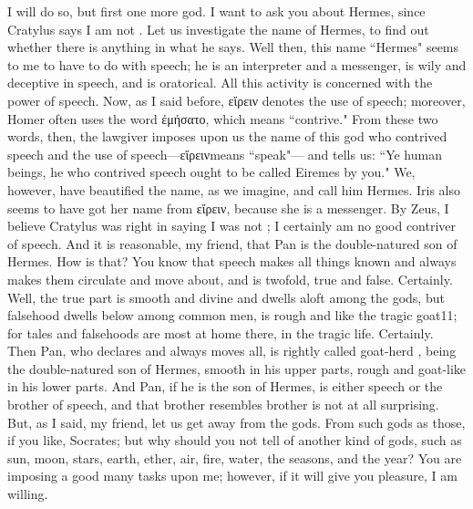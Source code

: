 {{{\hermogenesspeaks
I will do so, but first one more god. I want to ask you about Hermes, since Cratylus says I am not \hermogenesspeaks {}. Let us investigate the name of Hermes, to find out whether there is anything in what he says.
\socratesspeaks
Well then, this name ``Hermes" seems to me to have to do with speech; he is an interpreter  and a messenger,  is wily and deceptive in speech, and is oratorical. All this activity is concerned with the power of speech. Now, as I said before, εἴρειν denotes the use of speech; moreover, Homer often uses the word ἐμήσατο, which means ``contrive." From these two words, then, the lawgiver imposes upon us the name of this god who contrived speech and the use of speech—εἴρεινmeans ``speak"—  and tells us: ``Ye human beings, he who contrived speech  ought to be called Eiremes by you." We, however, have beautified the name, as we imagine, and call him Hermes. Iris also seems to have got her name from εἴρειν, because she is a messenger.
\hermogenesspeaks
By Zeus, I believe Cratylus was right in saying I was not \hermogenesspeaks; I certainly am no good contriver of speech.
\socratesspeaks
And it is reasonable, my friend, that Pan is the double-natured son of Hermes. 
\hermogenesspeaks
How is that?
\socratesspeaks
You know that speech makes all things  known and always makes them circulate and move about, and is twofold, true and false.
\hermogenesspeaks
Certainly.
\socratesspeaks
Well, the true part is smooth and divine and dwells aloft among the gods, but falsehood dwells below among common men, is rough and like the tragic goat11; for tales and falsehoods are most at home there, in the tragic life.
\hermogenesspeaks
Certainly.
\socratesspeaks
Then Pan, who declares and always moves  all, is rightly called goat-herd ,  being the double-natured son of Hermes, smooth in his upper parts, rough and goat-like in his lower parts. And Pan, if he is the son of Hermes, is either speech or the brother of speech, and that brother resembles brother is not at all surprising. But, as I said, my friend, let us get away from the gods.
\hermogenesspeaks
From such gods as those, if you like, Socrates; but why should you not tell of another kind of gods, such as sun, moon, stars, earth,  ether, air, fire, water, the seasons, and the year?
\socratesspeaks
You are imposing a good many tasks upon me; however, if it will give you pleasure, I am willing.
\hermogenesspeaks
}}}
